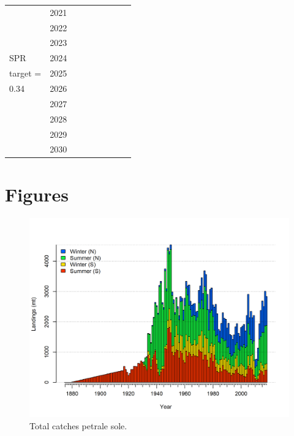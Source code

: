 \documentclass[12pt,]{article}
\begin{document}
\begin{table}[ht]
{\begin{tabular}{l|cc|>{\centering}p{.7in}c|>{\centering}p{.7in}c|>{\centering}p{.7in}c}
   \hline
 & 2021 &  &  &  &  &  &  &  \\ 
   & 2022 &  &  &  &  &  &  &  \\ 
   & 2023 &  &  &  &  &  &  &  \\ 
  SPR  & 2024 &  &  &  &  &  &  &  \\ 
  target =  & 2025 &  &  &  &  &  &  &  \\ 
  0.34 & 2026 &  &  &  &  &  &  &  \\ 
   & 2027 &  &  &  &  &  &  &  \\ 
   & 2028 &  &  &  &  &  &  &  \\ 
   & 2029 &  &  &  &  &  &  &  \\ 
   & 2030 &  &  &  &  &  &  &  \\ 
   \hline
\end{tabular}
}
\end{table}

\clearpage

\section{Figures}\label{figures}

\FloatBarrier

\begin{figure}
\centering
\includegraphics{r4ss/plots_mod1/catch2 landings stacked.png}
\caption{Total catches petrale sole. \label{fig:Catch}}
\end{figure}

\FloatBarrier
\end{document}
